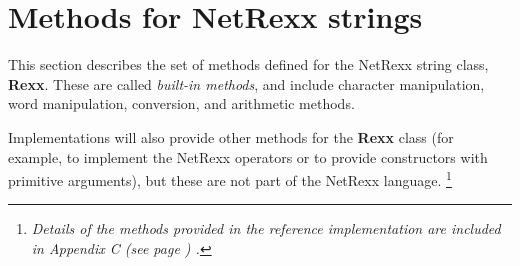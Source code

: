 \chapter{Methods for NetRexx strings}\label{"id"}
\index{,}
\index{,}
\index{,}
\index{,}
\index{,}
\index{,}
\index{,}
\index{,}
\index{,}
 This section describes the set of methods defined for the NetRexx
string class, \textbf{Rexx}.  These are called \emph{built-in
methods}, and include character manipulation, word manipulation,
conversion, and arithmetic methods.
 
Implementations will also provide other methods for the \textbf{Rexx}
class (for example, to implement the NetRexx operators or to provide
constructors with primitive arguments), but these are not part of the
NetRexx language.
\footnote{
\emph{Details of the methods provided in the reference implementation are
included in  Appendix C (see page \pageref{refappc}) .}
}
